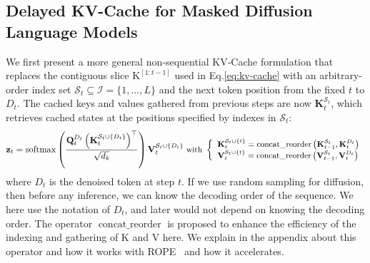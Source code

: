 \documentclass{article}
\begin{document}
\subsection{Delayed KV-Cache for Masked Diffusion Language Models}
We first present a more general non‑sequential KV‑Cache formulation that replaces the contiguous slice $\text{K}^{[1{:}t-1]}$ used in Eq.\ref{eq:kv-cache} with an arbitrary-order index set $\mathcal S_t\subseteq \mathcal I=\{1,\dots,L\}$ and the next token position from the fixed $t$ to $D_t$. The cached keys and values gathered from previous steps are now $\mathbf{K}_t^{\mathcal{S}_t}$, which retrieves cached states at the positions specified by indexes in $\mathcal S_t$:
\begin{equation}
\small
    \mathbf{z}_t=\operatorname{softmax}\left(\frac{\mathbf{Q}_t^{D_t}\left(\mathbf{K}_t^{\mathcal{S}_t \cup\{D_t\}}\right)^{\top}}{\sqrt{d_k}}\right) \mathbf{V}_t^{\mathcal{S}_t \cup\{D_t\}} \text{ with } \left\{\begin{array}{l} \mathbf{K}_t^{\mathcal{S}_t \cup\{t\}}=\operatorname{concat\_reorder}\left(\mathbf{K}_{t-1}^{\mathcal{S}_t}, \mathbf{K}_t^{D_t}\right) \\ \mathbf{V}_t^{\mathcal{S}_t \cup\{t\}}=\operatorname{concat\_reorder}\left(\mathbf{V}_{t-1}^{\mathcal{S}_t}, \mathbf{V}_t^{D_t}\right) \end{array}\right. \label{eq:set_kv}
\end{equation}
where $D_t$ is the denoised token at step $t$. If we use random sampling for diffusion, then before any inference, we can know the decoding order of the sequence. We here use the notation of $D_t$, and later would not depend on knowing the decoding order. 
The operator $\operatorname{concat\_reorder}$ is proposed to enhance the efficiency of the indexing and gathering of K and V here. 
We explain in the appendix about this operator and how it works with ROPE~\cite{su2024roformer} and how it accelerates.
\end{document}
